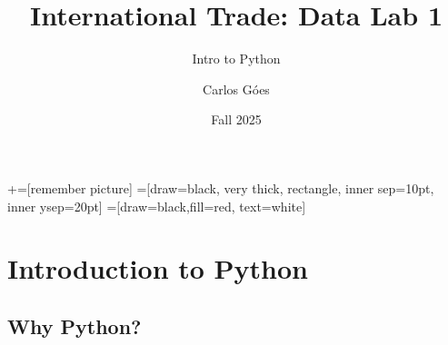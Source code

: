 \documentclass[notes,11pt, aspectratio=169, xcolor=table]{beamer}
\title[]{International Trade: Data Lab 1}
\subtitle[]{Intro to Python}
\author[Góes]
{Carlos Góes\inst{1}}
\date{Fall 2025}
\institute[GWU]{\inst{1} George Washington University }
\begin{document}
\newcommand\marktopleft[1]{%
    \tikz[overlay,remember picture] 
        \node (marker-#1-a) at (-.3em,.3em) {};%
}
\newcommand\markbottomright[2]{%
    \tikz[overlay,remember picture] 
        \node (marker-#1-b) at (0em,0em) {};%
}
+=[remember picture] 
 =[draw=black, very thick, rectangle, inner sep=10pt, inner ysep=20pt]
 =[draw=black,fill=red, text=white]















\frame{\titlepage}
\addtocounter{framenumber}{-1}




\section{Introduction to Python}

\subsection{Why Python?}
\end{document}
